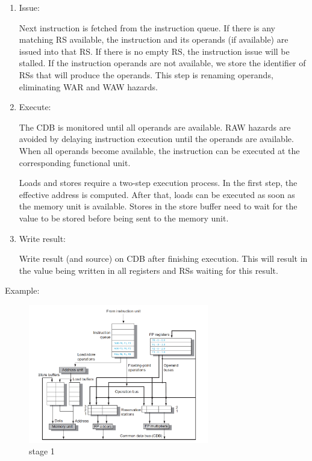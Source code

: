 \documentclass[12pt]{article}
\begin{document}
\begin{enumerate}
	\item Issue:
	
	Next instruction is fetched from the instruction queue. If there is any matching RS available, the instruction and its operands  (if available) are issued into that RS. If there is no empty RS, the instruction issue will be stalled.
	If the instruction operands are not available, we store the identifier of RSs that will produce the operands. This step is renaming operands, eliminating WAR and WAW hazards.
	
	\item Execute:
	
	The CDB is monitored until all operands are available. RAW hazards are avoided by delaying instruction execution until the operands are available. When all operands become available, the instruction can be executed at the corresponding functional unit.
	
	Loads and stores require a two-step execution process. In the first step, the effective address is computed. After that, loads can be executed as soon as the memory unit is available. Stores in the store buffer need to wait for the value to be stored before being sent to the memory unit.
	
	\item Write result:
	
	Write result (and source) on CDB after finishing execution. This will result in the value being written in all registers and RSs waiting for this result.
	
\end{enumerate}


Example:

\begin{figure}[H]
	\centering
	\includegraphics[width=0.7\textwidth]{./images/tomas/e1.png}	
	\cprotect\caption{stage 1}
\end{figure}
\end{document}
